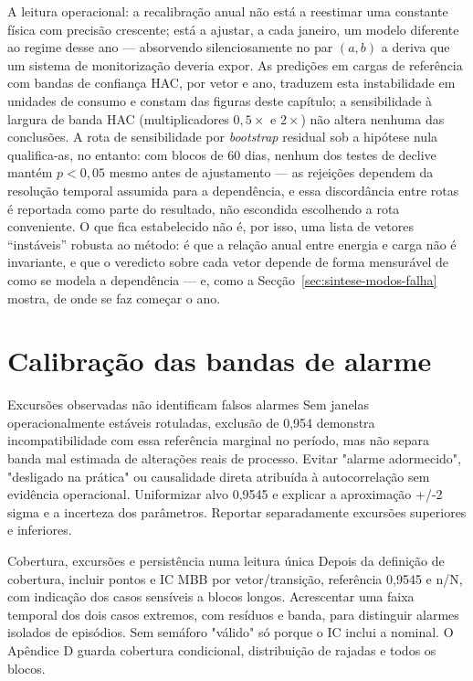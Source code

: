 A leitura operacional: a recalibração anual não está a reestimar uma constante
física com precisão crescente; está a ajustar, a cada janeiro, um modelo
diferente ao regime desse ano --- absorvendo silenciosamente no par $(a, b)$ a
deriva que um sistema de monitorização deveria expor. As predições em cargas
de referência com bandas de confiança HAC, por vetor e ano, traduzem esta
instabilidade em unidades de consumo e constam das figuras deste capítulo;
a sensibilidade à largura de banda HAC (multiplicadores $0{,}5\times$ e
$2\times$) não altera nenhuma das conclusões. A rota de sensibilidade por
\emph{bootstrap} residual sob a hipótese nula qualifica-as, no entanto: com
blocos de 60 dias, nenhum dos testes de declive mantém $p<0{,}05$ mesmo antes
de ajustamento --- as rejeições dependem da resolução temporal assumida para
a dependência, e essa discordância entre rotas é reportada como parte do
resultado, não escondida escolhendo a rota conveniente. O que fica
estabelecido não é, por isso, uma lista de vetores ``instáveis'' robusta ao
método: é que a relação anual entre energia e carga não é invariante, e que
o veredicto sobre cada vetor depende de forma mensurável de como se modela
a dependência --- e, como a Secção~\ref{sec:sintese-modos-falha} mostra, de
onde se faz começar o ano.

\section{Calibração das bandas de alarme}
\label{sec:calibracao}
{Excursões observadas não identificam falsos alarmes}
{Sem janelas operacionalmente estáveis rotuladas, exclusão de 0,954
demonstra incompatibilidade com essa referência marginal no período,
mas não separa banda mal estimada de alterações reais de processo.
Evitar "alarme adormecido", "desligado na prática" ou causalidade direta
atribuída à autocorrelação sem evidência operacional. Uniformizar alvo
0,9545 e explicar a aproximação +/-2 sigma e a incerteza dos parâmetros.
Reportar separadamente excursões superiores e inferiores.}%

{Cobertura, excursões e persistência numa leitura única}
{Depois da definição de cobertura, incluir pontos e IC MBB por
vetor/transição, referência 0,9545 e n/N, com indicação dos casos sensíveis
a blocos longos. Acrescentar uma faixa temporal dos dois casos extremos,
com resíduos e banda, para distinguir alarmes isolados de episódios.
Sem semáforo "válido" só porque o IC inclui a nominal. O Apêndice D
guarda cobertura condicional, distribuição de rajadas e todos os blocos.}%

